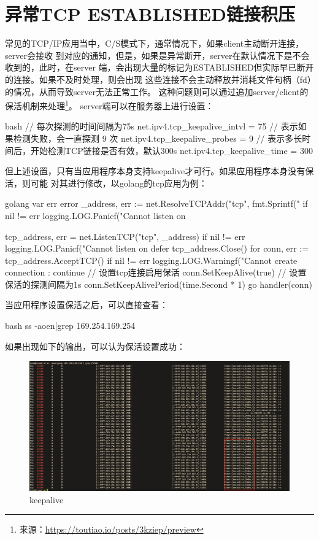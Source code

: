 \section{异常TCP ESTABLISHED链接积压}
常见的TCP/IP应用当中，C/S模式下，通常情况下，如果client主动断开连接，server会接收
到对应的通知，但是，如果是异常断开，server在默认情况下是不会收到的，此时，在server
端，会出现大量的标记为ESTABLISHED但实际早已断开的连接。如果不及时处理，则会出现
这些连接不会主动释放并消耗文件句柄（fd）的情况，从而导致server无法正常工作。
这种问题则可以通过追加server/client的保活机制来处理\footnote{来源：\url{https://toutiao.io/posts/3kziep/preview}}。
server端可以在服务器上进行设置：
\begin{code-block}{bash}
// 每次探测的时间间隔为75s
net.ipv4.tcp_keepalive_intvl = 75
// 表示如果检测失败，会一直探测 9 次
net.ipv4.tcp_keepalive_probes = 9
// 表示多长时间后，开始检测TCP链接是否有效，默认300s
net.ipv4.tcp_keepalive_time = 300
\end{code-block}
但上述设置，只有当应用程序本身支持keepalive才可行。如果应用程序本身没有保活，则可能
对其进行修改，以golang的tcp应用为例：
\begin{code-block}{golang}
var err error
_address, err := net.ResolveTCPAddr("tcp", fmt.Sprintf("%
if nil != err {
        logging.LOG.Panicf("Cannot listen on %
}

tcp_address, err = net.ListenTCP("tcp", _address)
if nil != err {
        logging.LOG.Panicf("Cannot listen on %
}
defer tcp_address.Close()
for {
        conn, err := tcp_address.AcceptTCP()
        if nil != err {
                logging.LOG.Warningf("Cannot create connection :%
                continue
        }
        // 设置tcp连接启用保活
        conn.SetKeepAlive(true)
        // 设置保活的探测间隔为1s
        conn.SetKeepAlivePeriod(time.Second * 1)
        go handler(conn)
}
\end{code-block}
当应用程序设置保活之后，可以直接查看：
\begin{code-block}{bash}
ss -aoen|grep 169.254.169.254
\end{code-block}
如果出现如下的输出，可以认为保活设置成功：
\begin{figure}[H]
  \centering
  \includegraphics[width=\linewidth]{keepalive.png}
  \caption{keepalive}
  \label{fig:keepalive}
\end{figure}
